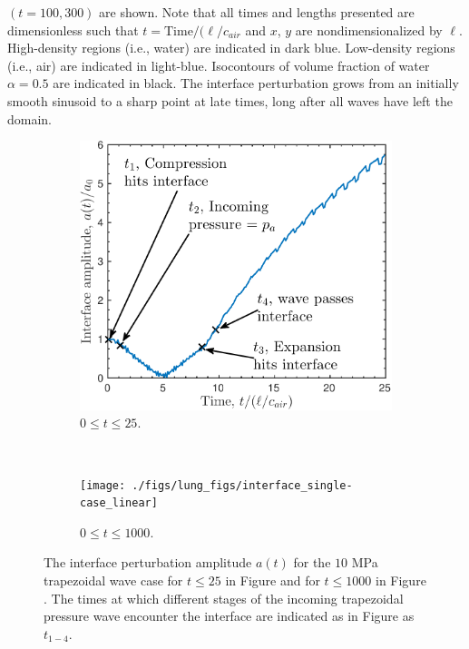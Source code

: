 \documentclass{article}
\begin{document}
$(t=100, 300)$ are shown. Note that all times and lengths presented are
dimensionless such that $t = \text{Time}/(\ell/c_{air}$ and $x$,
$y$ are nondimensionalized by $\ell$. High-density regions (i.e.,
water) are indicated in dark blue. Low-density regions (i.e., air) are
indicated in light-blue. Isocontours of volume fraction of water
$\alpha=0.5$ are indicated in black. The interface
perturbation grows from an initially smooth sinusoid to a sharp point
at late times, long after all waves have left the domain.
% 
\begin{figure}[h] 
  \centering
  \begin{subfigure}[b]{0.45\textwidth}
    \centering
    \includegraphics[width=\textwidth]{./figs/lung_figs/trapz10_intf_schematic}
    \caption{\label{fig:trapz10_interface25} $0\leq t \leq 25$.}
  \end{subfigure}
  ~
  \begin{subfigure}[b]{0.45\textwidth}
    \centering
    \texttt{[image: ./figs/lung\_figs/interface\_single-case\_linear]}%
    \caption{\label{fig:trapz10_interface1000} $0\leq t \leq 1000$.}
  \end{subfigure}
  \caption[The interface perturbation amplitude history for 10 MPa
  trapezoidal wave]{The interface perturbation amplitude $a(t)$ for
    the $10$ MPa trapezoidal wave case for $t\leq25$ in Figure \protect{} and for
    $t\leq1000$ in Figure \protect{}. The times at which different stages of the
    incoming trapezoidal pressure wave encounter the interface are
    indicated as in Figure \protect{} as $t_{1-4}$.}
  \label{fig:trapz10_interface}
\end{figure}\par
\end{document}
